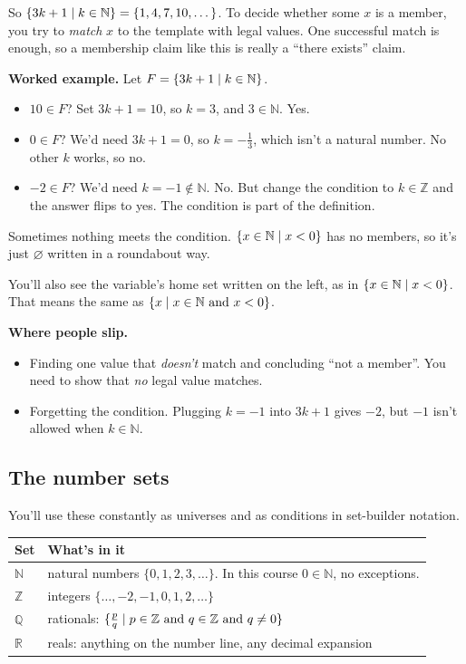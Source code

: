 So $\{3k+1\mathrel{|} k\in\mathbb{N}\}=\{1,4,7,10,\dots\}$. To decide whether some $x$ is a member, you try to \emph{match} $x$ to the template with legal values. One successful match is enough, so a membership claim like this is really a ``there exists'' claim.

\textbf{Worked example.} Let $F=\{3k+1\mathrel{|} k\in\mathbb{N}\}$.
\begin{itemize}
  \item $10\in F$? Set $3k+1=10$, so $k=3$, and $3\in\mathbb{N}$. Yes.
  \item $0\in F$? We'd need $3k+1=0$, so $k=-\tfrac13$, which isn't a natural number. No other $k$ works, so no.
  \item $-2\in F$? We'd need $k=-1\notin\mathbb{N}$. No. But change the condition to $k\in\mathbb{Z}$ and the answer flips to yes. The condition is part of the definition.
\end{itemize}

Sometimes nothing meets the condition. $\{x\in\mathbb{N}\mathrel{|} x<0\}$ has no members, so it's just $\varnothing$ written in a roundabout way.

You'll also see the variable's home set written on the left, as in $\{x\in\mathbb{N}\mathrel{|} x<0\}$. That means the same as $\{x\mathrel{|} x\in\mathbb{N}\text{ and }x<0\}$.

\textbf{Where people slip.}
\begin{itemize}
  \item Finding one value that \emph{doesn't} match and concluding ``not a member''. You need to show that \emph{no} legal value matches.
  \item Forgetting the condition. Plugging $k=-1$ into $3k+1$ gives $-2$, but $-1$ isn't allowed when $k\in\mathbb{N}$.
\end{itemize}

\subsection{The number sets}

You'll use these constantly as universes and as conditions in set-builder notation.

\begin{center}
\begin{tabularx}{\linewidth}{@{}lL@{}}
\toprule
\textbf{Set} & \textbf{What's in it}\\
\midrule
$\mathbb{N}$ & natural numbers $\{0,1,2,3,\dots\}$. In this course $0\in\mathbb{N}$, no exceptions.\\
$\mathbb{Z}$ & integers $\{\dots,-2,-1,0,1,2,\dots\}$\\
$\mathbb{Q}$ & rationals: $\{\frac pq\mathrel{|} p\in\mathbb{Z}\text{ and }q\in\mathbb{Z}\text{ and }q\neq0\}$\\
$\mathbb{R}$ & reals: anything on the number line, any decimal expansion\\
\bottomrule
\end{tabularx}
\end{center}

